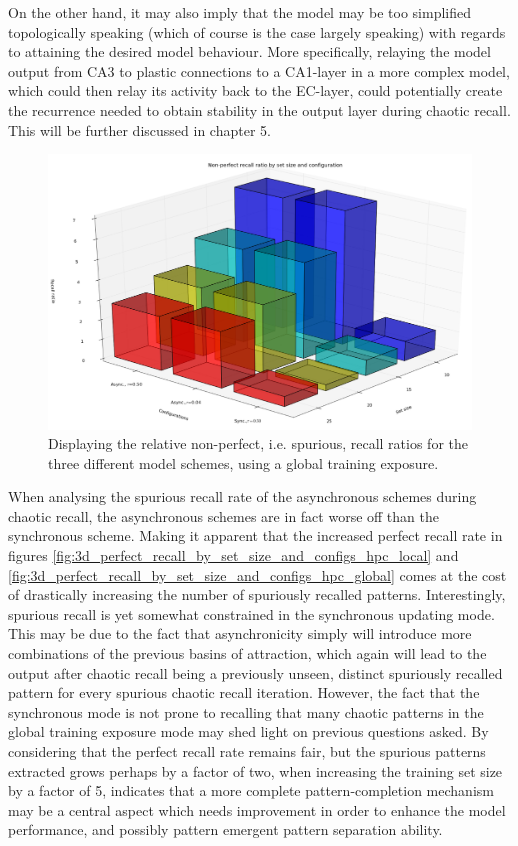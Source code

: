 On the other hand, it may also imply that the model may be too simplified topologically speaking (which of course is the case largely speaking) with regards to attaining the desired model behaviour. More specifically, relaying the model output from CA3 to plastic connections to a CA1-layer in a more complex model, which could then relay its activity back to the EC-layer, could potentially create the recurrence needed to obtain stability in the output layer during chaotic recall. This will be further discussed in chapter 5.

\begin{figure}
    \centering
    \includegraphics[width=13cm]{fig/3d_non_perfect_recall_by_set_size_and_configs_hpc_global_cut}
    \caption{Displaying the relative non-perfect, i.e. spurious, recall ratios for the three different model schemes, using a global training exposure.}
    \label{fig:3d_non_perfect_recall_by_set_size_and_configs_hpc_global_cut}
\end{figure}

When analysing the spurious recall rate of the asynchronous schemes during chaotic recall, the asynchronous schemes are in fact worse off than the synchronous scheme. Making it apparent that the increased perfect recall rate in figures \ref{fig:3d_perfect_recall_by_set_size_and_configs_hpc_local} and \ref{fig:3d_perfect_recall_by_set_size_and_configs_hpc_global} comes at the cost of drastically increasing the number of spuriously recalled patterns. Interestingly, spurious recall is yet somewhat constrained in the synchronous updating mode. This may be due to the fact that asynchronicity simply will introduce more combinations of the previous basins of attraction, which again will lead to the output after chaotic recall being a previously unseen, distinct spuriously recalled pattern for every spurious chaotic recall iteration. However, the fact that the synchronous mode is not prone to recalling that many chaotic patterns in the global training exposure mode may shed light on previous questions asked. By considering that the perfect recall rate remains fair, but the spurious patterns extracted grows perhaps by a factor of two, when increasing the training set size by a factor of 5, indicates that a more complete pattern-completion mechanism may be a central aspect which needs improvement in order to enhance the model performance, and possibly pattern emergent pattern separation ability.

